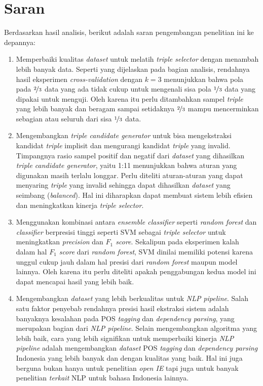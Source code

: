 \section{Saran}

Berdasarkan hasil analisis, berikut adalah saran pengembangan penelitian ini ke depannya:

\begin{enumerate}
	\item Memperbaiki kualitas \textit{dataset} untuk melatih \textit{triple selector} dengan menambah lebih banyak data. Seperti yang dijelaskan pada bagian analisis, rendahnya hasil eksperimen \textit{cross-validation} dengan $k = 3$ menunjukkan bahwa pola pada $\nicefrac{2}{3}$ data yang ada tidak cukup untuk mengenali sisa pola $\nicefrac{1}{3}$ data yang dipakai untuk menguji. Oleh karena itu perlu ditambahkan sampel \textit{triple} yang lebih banyak dan beragam sampai setidaknya $\nicefrac{2}{3}$ mampu mencerminkan sebagian atau seluruh dari sisa $\nicefrac{1}{3}$ data.
	
	\item Mengembangkan \textit{triple candidate generator} untuk bisa mengekstraksi kandidat \textit{triple} implisit dan mengurangi kandidat \textit{triple} yang invalid. Timpangnya rasio sampel positif dan negatif dari \textit{dataset} yang dihasilkan \textit{triple candidate generator}, yaitu 1:11 menunjukkan bahwa aturan yang digunakan masih terlalu longgar. Perlu diteliti aturan-aturan yang dapat menyaring \textit{triple} yang invalid sehingga dapat dihasilkan \textit{dataset} yang seimbang (\textit{balanced}). Hal ini diharapkan dapat membuat sistem lebih efisien dan meningkatkan kinerja \textit{triple selector}.
	
	\item Menggunakan kombinasi antara \textit{ensemble classifier} seperti \textit{random forest} dan \textit{classifier} berpresisi tinggi seperti SVM sebagai \textit{triple selector} untuk meningkatkan \textit{precision} dan \textit{$F_1$ score}. Sekalipun pada eksperimen kalah dalam hal \textit{$F_1$ score} dari \textit{random forest}, SVM dinilai memiliki potensi karena unggul cukup jauh dalam hal presisi dari \textit{random forest} maupun model lainnya. Oleh karena itu perlu diteliti apakah penggabungan kedua model ini dapat mencapai hasil yang lebih baik.
	
	\item Mengembangkan \textit{dataset} yang lebih berkualitas untuk \textit{NLP pipeline}. Salah satu faktor penyebab rendahnya presisi hasil ekstraksi sistem adalah banyaknya kesalahan pada POS \textit{tagging} dan \textit{dependency parsing}, yang merupakan bagian dari \textit{NLP pipeline}. Selain mengembangkan algoritma yang lebih baik, cara yang lebih signifikan untuk memperbaiki kinerja \textit{NLP pipeline} adalah mengembangkan \textit{dataset} POS \textit{tagging} dan \textit{dependency parsing} Indonesia yang lebih banyak dan dengan kualitas yang baik. Hal ini juga berguna bukan hanya untuk penelitian \textit{open IE} tapi juga untuk banyak penelitian \textit{terkait} NLP untuk bahasa Indonesia lainnya.
	

\end{enumerate}
